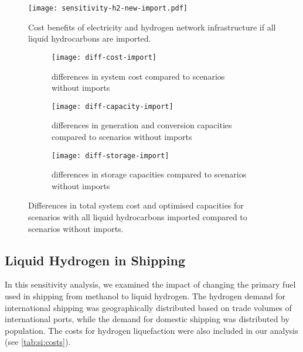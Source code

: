 \begin{SCfigure}
    \centering
    \texttt{[image: sensitivity-h2-new-import.pdf]}
    \caption{Cost benefits of electricity and hydrogen network infrastructure if all liquid hydrocarbons are imported.}
    \label{fig:sensitivity-imports}
\end{SCfigure}

\begin{figure}
    \centering
    \begin{subfigure}[t]{\textwidth}
        \centering
        \caption{differences in system cost compared to scenarios without imports}
        \texttt{[image: diff-cost-import]}
        \label{fig:sensitivity-import-cost}
    \end{subfigure}
    \begin{subfigure}[t]{\textwidth}
        \centering
        \caption{differences in generation and conversion capacities compared to scenarios without imports}
        \texttt{[image: diff-capacity-import]}
        \label{fig:sensitivity-import-cap}
    \end{subfigure}
    \begin{subfigure}[t]{\textwidth}
        \centering
        \caption{differences in storage capacities compared to scenarios without imports}
        \texttt{[image: diff-storage-import]}
        \label{fig:sensitivity-import-sto}
    \end{subfigure}
    \caption{Differences in total system cost and optimised capacities for scenarios with all liquid hydrocarbons imported compared to scenarios without imports.}
    \label{fig:sensitivity-import-diff}
\end{figure}


\subsection{Liquid Hydrogen in Shipping}
\label{sec:si:sensitivity-shipping}

In this sensitivity analysis, we examined the impact of changing the primary
fuel used in shipping from methanol to liquid hydrogen. The hydrogen demand for
international shipping was geographically distributed based on trade volumes of
international ports, while the demand for domestic
shipping was distributed by population. The costs for hydrogen liquefaction were
also included in our analysis (see \cref{tab:si:costs}).

